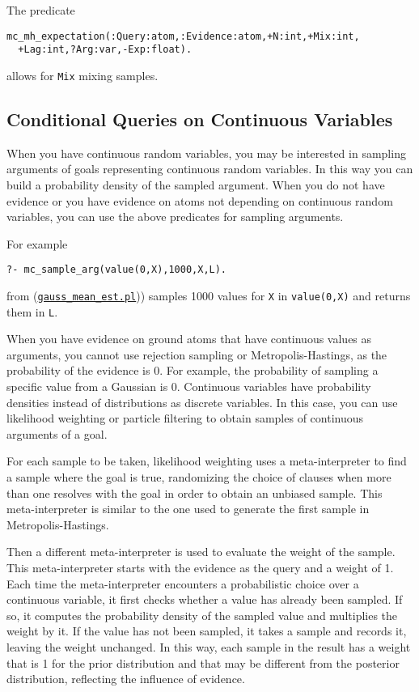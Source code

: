 The predicate
\begin{verbatim}
mc_mh_expectation(:Query:atom,:Evidence:atom,+N:int,+Mix:int,
  +Lag:int,?Arg:var,-Exp:float).
\end{verbatim}
allows for \verb|Mix| mixing samples.

\subsection{Conditional Queries on Continuous Variables}
\label{condqcont}

When you have continuous random variables, you may be interested in
sampling arguments of goals representing continuous random variables.
In this way you can build a probability density of the sampled argument.
When you do not have evidence or you have evidence on atoms not depending
on continuous random variables, you can use the above predicates for sampling
arguments.

For example
\begin{verbatim}
?- mc_sample_arg(value(0,X),1000,X,L).
\end{verbatim}
from (\href{http://cplint.ml.unife.it/example/inference/gauss_mean_est.pl}{\texttt{gauss\_mean\_est.pl}})) samples 1000 values for \verb|X| in
\verb|value(0,X)| and returns them in \verb|L|.

When you have evidence on ground atoms that have continuous values as
arguments, you cannot use rejection sampling or Metropolis-Hastings,
as the probability of the evidence is 0. For example,
the probability of sampling a specific value from a Gaussian is 0.
Continuous variables have probability densities instead of distributions as
discrete variables.
In this case, you can use likelihood weighting or particle filtering \cite{fung1990weighing,koller2009probabilistic,Nitti2016} to obtain samples of
continuous arguments of a goal.

For each sample to be taken, likelihood weighting
uses a meta-interpreter to find a sample where
the goal is true, randomizing the choice of
clauses when more than one resolves with the goal
in order to obtain an unbiased sample.
This meta-interpreter is similar to the one used
to generate the first sample in Metropolis-Hastings.

Then a different meta-interpreter is used to evaluate
the weight of the sample.
This meta-interpreter starts with the evidence as the query and a weight of 1. Each time the meta-interpreter encounters
a probabilistic choice over a continuous variable, it first checks whether a
value has already been sampled.
If so, it computes the probability density of the sampled value and multiplies the weight by it. If the value has not been sampled, it takes a sample and records it,
leaving the weight unchanged.
In this way, each sample in the result has a weight that is 1 for the prior distribution and that may be different from the posterior distribution,
reflecting the influence of evidence.

